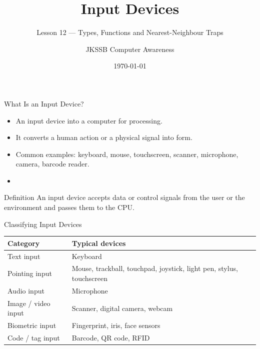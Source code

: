 \documentclass[aspectratio=169]{beamer}
\title{Input Devices}
\subtitle{Lesson 12 --- Types, Functions and Nearest-Neighbour Traps}
\author{JKSSB Computer Awareness}
\date{\today}
\begin{document}
\frame{\titlepage}

\begin{frame}{What Is an Input Device?}
  \begin{itemize}
    \item An input device  into a computer
      for processing.
    \item It converts a human action or a physical signal into
       form.
    \item Common examples: keyboard, mouse, touchscreen, scanner,
      microphone, camera, barcode reader.
    \item {}
  \end{itemize}
  \begin{block}{Definition}
    An input device accepts data or control signals from the user or the
    environment and passes them to the CPU.
  \end{block}
\end{frame}

\begin{frame}{Classifying Input Devices}
  \begin{center}
    \begin{tabular}{p{}p{}}
      \toprule
      \textbf{Category} & \textbf{Typical devices} \\
      \midrule
      Text input & Keyboard \\
      Pointing input & Mouse, trackball, touchpad, joystick, light pen, stylus, touchscreen \\
      Audio input & Microphone \\
      Image / video input & Scanner, digital camera, webcam \\
      Biometric input & Fingerprint, iris, face sensors \\
      Code / tag input & Barcode, QR code, RFID \\
      \bottomrule
    \end{tabular}
  \end{center}
  \vspace{0.2cm}
\end{frame}
\end{document}
